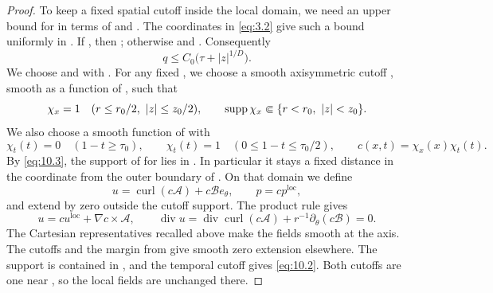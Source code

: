 \begin{proof}
To keep a fixed spatial cutoff inside the local domain, we need an upper bound for
 in terms of  and
. The coordinates in \eqref{eq:3.2} give such a bound uniformly in
. If , then
; otherwise
 and
. Consequently
\begin{equation}
q\leq C_0\bigl(\tau+|z|^{1/D}\bigr).
\tag{10.3}\label{eq:10.3}
\end{equation}
We choose  and  with
. For any fixed
, we choose a smooth axisymmetric cutoff
, smooth as a function of
, such that
\[
\chi_x=1\quad(r\leq r_0/2,\ |z|\leq z_0/2),
\qquad \operatorname{supp}\chi_x\Subset\{r<r_0,\ |z|<z_0\}.
\]
We also choose a smooth function  of
 with
\[
\chi_t(t)=0\quad(1-t\geq\tau_0),
\qquad \chi_t(t)=1\quad(0\leq1-t\leq\tau_0/2),
\qquad c(x,t)=\chi_x(x)\chi_t(t).
\]
By \eqref{eq:10.3}, the support of  for
 lies in . In particular it stays a fixed
distance in the  coordinate from the outer boundary of
. On that domain we define
\begin{equation}
u=\operatorname{curl}(c\mathcal A)+c\mathcal Be_\theta,
\qquad p=cp^{\mathrm{loc}},
\tag{10.4}\label{eq:10.4}
\end{equation}
and extend by zero outside the cutoff support. The product rule gives
\[
u=cu^{\mathrm{loc}}+\nabla c\times\mathcal A,
\qquad \operatorname{div}u=\operatorname{div}\operatorname{curl}(c\mathcal A)
 +r^{-1}\partial_\theta(c\mathcal B)=0.
\]
The Cartesian representatives recalled above make the fields smooth at the axis. The cutoffs and
the margin from  give smooth zero extension elsewhere. The support is
contained in , and the temporal cutoff gives \eqref{eq:10.2}.
Both cutoffs are one near , so the local fields are unchanged there.
\end{proof}

